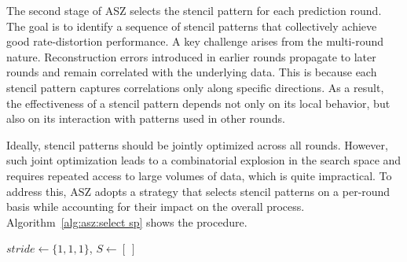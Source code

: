 


The second stage of ASZ selects the stencil pattern for each prediction round.
The goal is to identify a sequence of stencil patterns that collectively achieve good rate-distortion performance.
A key challenge arises from the multi-round nature.
Reconstruction errors introduced in earlier rounds propagate to later rounds and remain correlated with the underlying data.
This is because each stencil pattern captures correlations only along specific directions.
As a result, the effectiveness of a stencil pattern depends not only on its local behavior, but also on its interaction with patterns used in other rounds.

Ideally, stencil patterns should be jointly optimized across all rounds.
However, such joint optimization leads to a combinatorial explosion in the search space and requires repeated access to large volumes of data, which is quite impractical.
To address this, ASZ adopts a strategy that selects stencil patterns on a per-round basis while accounting for their impact on the overall process.
Algorithm~\ref{alg:asz:select sp} shows the procedure.


\begin{algorithm}[h]
\small
\caption{Select Stencil Patterns}
\label{alg:asz:select sp}
$stride \leftarrow \{1,1,1\}$, $S \leftarrow [\ ]$\;
\;
\end{algorithm}

